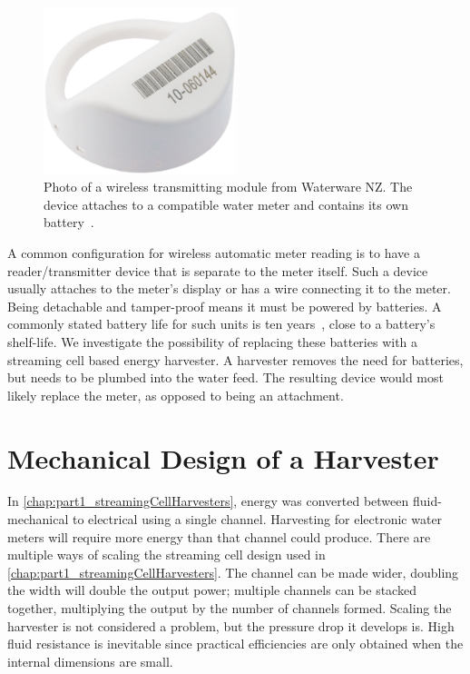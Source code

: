   \begin{figure}
    \centering
    \label{fig:Photo_waterwareMeter}
    \includegraphics[width=0.5\textwidth]{content/pt1/02-WirelessWaterMeter/graphics/hydro-WMBUSWLESSM}
    \caption[Photo of a wireless transmitting module from Waterware NZ.]{
      Photo of a wireless transmitting module from Waterware NZ.
      The device attaches to a compatible water meter and contains its own battery~\cite{BMeters2014}.
    }
  \end{figure}
  A common configuration for wireless automatic meter reading is to have a reader/transmitter device that is separate to the meter itself.
  Such a device usually attaches to the meter's display or has a wire connecting it to the meter.
  Being detachable and tamper-proof means it must be powered by batteries.
  A commonly stated battery life for such units is ten years~\cite{BMeters2014}, close to a battery's shelf-life.
  We investigate the possibility of replacing these batteries with a streaming cell based energy harvester.
  A harvester removes the need for batteries, but needs to be plumbed into the water feed.
  The resulting device would most likely replace the meter, as opposed to being an attachment.


  \section{Mechanical Design of a Harvester}

    In \cref{chap:part1_streamingCellHarvesters}, energy was converted between fluid-mechanical to electrical using a single channel.
    Harvesting for electronic water meters will require more energy than that channel could produce.
    There are multiple ways of scaling the streaming cell design used in \cref{chap:part1_streamingCellHarvesters}.
    The channel can be made wider, doubling the width will double the output power;
    multiple channels can be stacked together, multiplying the output by the number of channels formed.
    Scaling the harvester is not considered a problem, but the pressure drop it develops is.
    High fluid resistance is inevitable since practical efficiencies are only obtained when the internal dimensions are small.


